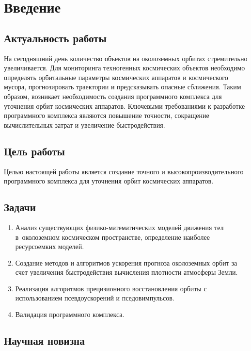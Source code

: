 \section{Введение}
\label{sec:Chapter0} 

\subsection*{Актуальность работы}

На сегодняшний день количество объектов на околоземных орбитах стремительно увеличивается.
Для мониторинга техногенных космических объектов необходимо
определять орбитальные параметры космических аппаратов и космического мусора,
прогнозировать траектории и предсказывать опасные сближения.
Таким образом, возникает необходимость создания программного 
комплекса для уточнения орбит космических аппаратов. 
Ключевыми требованиями к разработке программного 
комплекса являются повышение точности, 
сокращение вычислительных затрат и увеличение быстродействия.

\subsection*{Цель работы}

Целью настоящей работы является создание точного и высокопроизводительного 
программного комплекса для уточнения орбит космических аппаратов.

\subsection*{Задачи}

\begin{enumerate}
    \item Анализ существующих физико-математических моделей движения тел 
    в околоземном космическом пространстве, определение наиболее ресурсоемких моделей.
    \item Создание методов и алгоритмов ускорения прогноза околоземных орбит 
    за счет увеличения быстродействия вычисления плотности атмосферы Земли.
    \item Реализация алгоритмов прецизионного восстановления орбиты с использованием
    псевдоускорений и пседовимпульсов.
    \item Валидация программного комплекса.
\end{enumerate}

\subsection*{Научная новизна}

